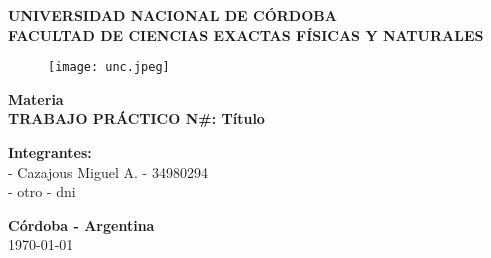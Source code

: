 \begin{titlepage}
  \begin{center}
    \vspace*{0.3cm}
    \Huge\textbf {UNIVERSIDAD NACIONAL DE C\'ORDOBA}\\
    \vspace*{0.3cm}
    \Large\textbf {FACULTAD DE CIENCIAS EXACTAS F\'ISICAS Y NATURALES}\\
    \vspace*{0.15cm}
    \begin{figure}[htb]
      \begin{center}
        \texttt{[image: unc.jpeg]}
      \end{center}
    \end{figure}
    \Large\textbf {Materia}\\
    \vspace*{0.3cm}
    \large\textbf {TRABAJO PR\'ACTICO N\textdegree \#: T\'itulo}\\
    \vspace*{2cm}
  \end{center}
  \begin{flushleft}
    \large\textbf {Integrantes:}\\
    \hspace{3cm}- Cazajous Miguel A. - 34980294\\
    \hspace{3cm}- otro - dni\\
  \end{flushleft}
  \begin{center}
    \begin{large}
      \vspace*{0.4cm}
      \small\textbf {C\'ordoba - Argentina}\\
      \small\today
    \end{large}
  \end{center}
\end{titlepage}
